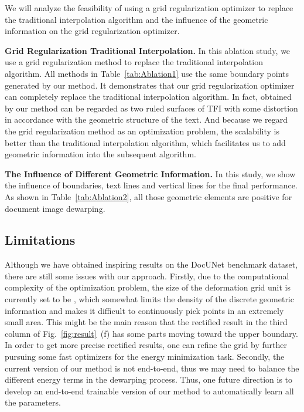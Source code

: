 \documentclass[10pt,twocolumn,letterpaper]{article}
\newcommand{\myparagraph}[1]{\vspace{1pt} \noindent \textbf{#1} }
\begin{document}
We will analyze the feasibility of using a grid regularization optimizer to replace the traditional interpolation algorithm and the influence of the geometric information on the grid regularization optimizer.

\myparagraph{Grid Regularization \vs Traditional Interpolation.} In this ablation study, we use a grid regularization method to replace the traditional interpolation algorithm. All methods in Table~\ref{tab:Ablation1} use the same boundary points generated by our method. It demonstrates that our grid regularization optimizer can completely replace the traditional interpolation algorithm. In fact,  obtained by our method can be regarded as two ruled surfaces of TFI with some distortion in accordance with the geometric structure of the text. And because we regard the grid regularization method as an optimization problem, the scalability is better than the traditional interpolation algorithm, which facilitates us to add geometric information into the subsequent algorithm.

\vspace{-1mm}
\myparagraph{The Influence of Different Geometric Information.}
In this study, we show the influence of boundaries, text lines and vertical lines for the final performance. As shown in Table~\ref{tab:Ablation2}, all those geometric elements are positive for document image dewarping.



\subsection{Limitations}
Although we have obtained inspiring results on the DocUNet benchmark dataset, there are still some issues with our approach. 
Firstly, due to the computational complexity of the optimization problem, the size of the deformation grid unit is currently set to be , which somewhat limits the density of the discrete geometric information and makes it difficult to continuously pick points in an extremely small area. This might be the main reason that the rectified result in the third column of Fig.~\ref{fig:result}~(f) has some parts moving toward the upper boundary. In order to get more precise rectified results, one can refine the grid by further pursuing some fast optimizers for the energy minimization task.  
Secondly, 
the current version of our method is not end-to-end, thus we may need to balance the different energy terms in the dewarping process.
Thus, one future direction is to develop an end-to-end trainable version of our method to automatically learn all the parameters.
\end{document}
